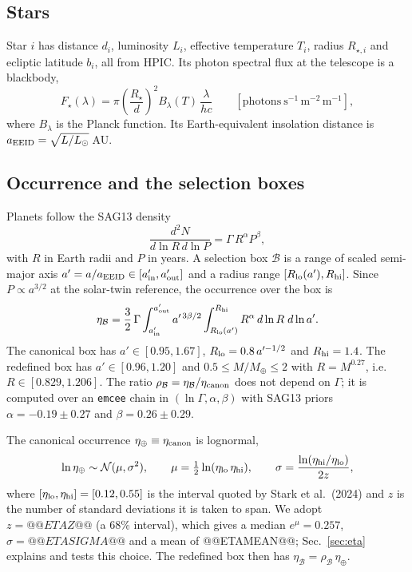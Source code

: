 \documentclass[11pt,a4paper]{article}
\begin{document}
\subsection{Stars}

Star $i$ has distance $d_i$, luminosity $L_i$, effective temperature $T_i$, radius $R_{\star,i}$
and ecliptic latitude $b_i$, all from HPIC. Its photon spectral flux at the telescope is a
blackbody,
\begin{equation}
F_\star(\lambda) = \pi\left(\frac{R_\star}{d}\right)^{2} B_\lambda(T)\,\frac{\lambda}{hc}
\qquad [\mathrm{photons\ s^{-1}\,m^{-2}\,m^{-1}}],
\label{eq:starflux}
\end{equation}
where $B_\lambda$ is the Planck function. Its Earth-equivalent insolation distance is
$a_{\rm EEID} = \sqrt{L/L_\odot}$\,AU.

\subsection{Occurrence and the selection boxes}

Planets follow the SAG13 density
\begin{equation}
\frac{d^2N}{d\ln R\,d\ln P} = \Gamma\,R^{\alpha}P^{\beta},
\label{eq:sag13}
\end{equation}
with $R$ in Earth radii and $P$ in years. A selection box $\mathcal{B}$ is a range of scaled
semi-major axis $a' = a/a_{\rm EEID} \in [a'_{\rm in}, a'_{\rm out}]$ and a radius range
$[R_{\rm lo}(a'), R_{\rm hi}]$. Since $P \propto a^{3/2}$ at the solar-twin reference, the
occurrence over the box is
\begin{equation}
\eta_\mathcal{B} = \frac{3}{2}\,\Gamma\int_{a'_{\rm in}}^{a'_{\rm out}} a'^{\,3\beta/2}
\int_{R_{\rm lo}(a')}^{R_{\rm hi}} R^{\alpha}\,d\ln R\;d\ln a'.
\label{eq:etabox}
\end{equation}
The canonical box has $a' \in [0.95, 1.67]$, $R_{\rm lo} = 0.8\,a'^{-1/2}$ and $R_{\rm hi} = 1.4$.
The redefined box has $a' \in [0.96, 1.20]$ and $0.5 \le M/M_\oplus \le 2$ with $R = M^{0.27}$,
i.e.\ $R \in [0.829, 1.206]$. The ratio $\rho_\mathcal{B} = \eta_\mathcal{B}/\eta_{\rm canon}$
does not depend on $\Gamma$; it is computed over an \texttt{emcee} chain in
$(\ln\Gamma, \alpha, \beta)$ with SAG13 priors $\alpha = -0.19 \pm 0.27$ and
$\beta = 0.26 \pm 0.29$.

The canonical occurrence $\eta_\oplus \equiv \eta_{\rm canon}$ is lognormal,
\begin{equation}
\ln\eta_\oplus \sim \mathcal{N}(\mu, \sigma^2), \qquad
\mu = \tfrac{1}{2}\ln(\eta_{\rm lo}\,\eta_{\rm hi}), \qquad
\sigma = \frac{\ln(\eta_{\rm hi}/\eta_{\rm lo})}{2z},
\label{eq:etalaw}
\end{equation}
where $[\eta_{\rm lo}, \eta_{\rm hi}] = [0.12, 0.55]$ is the interval quoted by Stark et al.\
(2024) and $z$ is the number of standard deviations it is taken to span. We adopt $z = @@ETAZ@@$
(a 68\% interval), which gives a median $e^{\mu} = 0.257$, $\sigma = @@ETASIGMA@@$ and a mean of
@@ETAMEAN@@; Sec.~\ref{sec:eta} explains and tests this choice. The redefined box then has
$\eta_\mathcal{B} = \rho_\mathcal{B}\,\eta_\oplus$.
\end{document}
